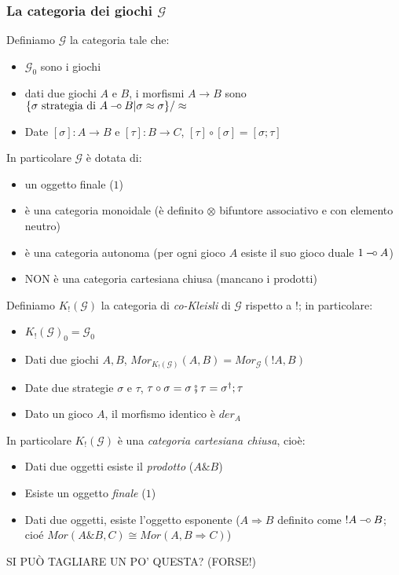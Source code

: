 \documentclass{beamer}
\newcommand{\limp}{\mathbin{{-}\mkern-3.5mu{\circ}}}
\begin{document}
\begin{frame}
	
	\frametitle{La categoria dei giochi $\mathcal{G}$}
	
	Definiamo $\mathcal{G}$ la categoria tale che:
	\begin{itemize}
		\item $\mathcal{G}_0$ sono i giochi
		\item dati due giochi $A$ e $B$, i morfismi $A\rightarrow B$ sono $\{ \sigma \text{ strategia di } A\limp B | \sigma \approx \sigma \} / \approx$
		\item Date $[\sigma] : A\rightarrow B$ e $[\tau] : B \rightarrow C$, $[\tau] \circ [\sigma] = [\sigma ; \tau]$
	\end{itemize}
	
	In particolare $\mathcal{G}$ è dotata di:
	\begin{itemize}
		\item un oggetto finale ($1$)
		\item è una categoria monoidale (è definito $\otimes$ bifuntore associativo e con elemento neutro)
		\item è una categoria autonoma (per ogni gioco $A$ esiste il suo gioco duale $1 \limp A$)
		\item NON è una categoria cartesiana chiusa (mancano i prodotti)
	\end{itemize}
	
\end{frame}

\begin{frame}

	Definiamo $K_!(\mathcal{G})$ la categoria di \emph{co-Kleisli} di $\mathcal{G}$ rispetto a $!$; in particolare:
	\begin{itemize}
		\item $K_!(\mathcal{G})_0 = \mathcal{G}_0$
		\item Dati due giochi $A,B$, $Mor_{K_!(\mathcal{G})}(A,B) = Mor_{\mathcal{G}}(!A,B)$
		\item Date due strategie $\sigma$ e $\tau$, $\tau \circ \sigma = \sigma \fatsemi \tau = \sigma ^\dag ; \tau$
		\item Dato un gioco $A$, il morfismo identico è $der_A$
	\end{itemize}

	In particolare $K_!(\mathcal{G})$ è una \emph{categoria cartesiana chiusa}, cioè:
	\begin{itemize}
		\item Dati due oggetti esiste il \emph{prodotto} ($A\& B$)
		\item Esiste un oggetto \emph{finale} ($1$)
		\item Dati due oggetti, esiste l'oggetto esponente ($A \Rightarrow B$ definito come $!A \limp B$; cioé $Mor(A\& B,C) \cong Mor(A,B\Rightarrow C)$)
	\end{itemize}

	SI PUÒ TAGLIARE UN PO' QUESTA? (FORSE!)

\end{frame}
\end{document}
